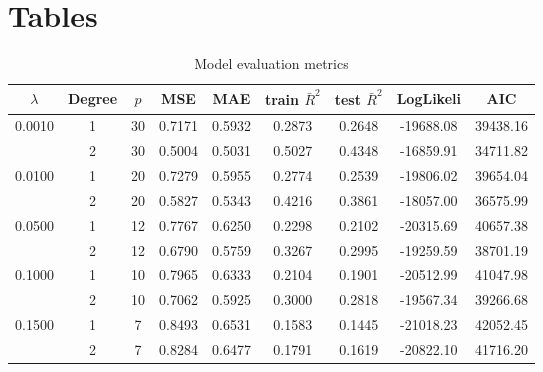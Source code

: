 \section{Tables}


\begin{table}[ht]\centering
    \caption{Model evaluation metrics}
    \label{tab:metrics}
    \begin{tabular}{ccccccccc}
    \toprule
    \textbf{$\lambda$} & \textbf{Degree} & \textbf{$p$} & \textbf{MSE} & \textbf{MAE} & \textbf{train $\bar R^2$} & \textbf{test $\bar R^2$} & \textbf{LogLikeli} & \textbf{AIC} \\
    \midrule
    \multirow{2}{*}{0.0010} & 1 & 30 & 0.7171 & 0.5932 & 0.2873 & 0.2648 & -19688.08 & 39438.16 \\
                            & 2 & 30 & 0.5004 & 0.5031 & 0.5027 & 0.4348 & -16859.91 & 34711.82 \\
    \multirow{2}{*}{0.0100} & 1 & 20 & 0.7279 & 0.5955 & 0.2774 & 0.2539 & -19806.02 & 39654.04 \\
                            & 2 & 20 & 0.5827 & 0.5343 & 0.4216 & 0.3861 & -18057.00 & 36575.99 \\
    \multirow{2}{*}{0.0500} & 1 & 12 & 0.7767 & 0.6250 & 0.2298 & 0.2102 & -20315.69 & 40657.38 \\
                            & 2 & 12 & 0.6790 & 0.5759 & 0.3267 & 0.2995 & -19259.59 & 38701.19 \\
    \multirow{2}{*}{0.1000} & 1 & 10 & 0.7965 & 0.6333 & 0.2104 & 0.1901 & -20512.99 & 41047.98 \\
                            & 2 & 10 & 0.7062 & 0.5925 & 0.3000 & 0.2818 & -19567.34 & 39266.68 \\
    \multirow{2}{*}{0.1500} & 1 & 7 & 0.8493 & 0.6531 & 0.1583 & 0.1445 & -21018.23 & 42052.45 \\
                            & 2 & 7 & 0.8284 & 0.6477 & 0.1791 & 0.1619 & -20822.10 & 41716.20 \\   
    \bottomrule
    \end{tabular}
\end{table}


